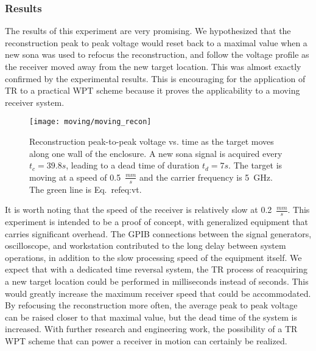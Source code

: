 \subsubsection{Results}
\label{moving-results}

The results of this experiment are very promising. We hypothesized that the reconstruction peak to peak voltage would reset back to a maximal value when a new sona was used to refocus the reconstruction, and follow the voltage profile as the receiver moved away from the new target location. This was almost exactly confirmed by the experimental results. This is encouraging for the application of TR to a practical WPT scheme because it proves the applicability to a moving receiver system.

\begin{figure}[t]
\centering
\texttt{[image: moving/moving\_recon]}
    \caption[Peak-to-peak voltage of moving reconstructions]{Reconstruction peak-to-peak voltage vs. time as the target moves along one wall of the enclosure. A new sona signal is acquired every $t_c = 39.8s$, leading to a dead time of duration $t_d = 7s$. The target is moving at a speed of 0.5~$\frac{mm}{s}$ and the carrier frequency is 5~GHz. The green line is Eq.~ref{eq:vt}.}
    \label{fig:moving-recon}
\end{figure}

It is worth noting that the speed of the receiver is relatively slow at 0.2~$\frac{mm}{s}$. This experiment is intended to be a proof of concept, with generalized equipment that carries significant overhead. The GPIB connections between the signal generators, oscilloscope, and workstation contributed to the long delay between system operations, in addition to the slow processing speed of the equipment itself. We expect that with a dedicated time reversal system, the TR process of reacquiring a new target location could be performed in milliseconds instead of seconds. This would greatly increase the maximum receiver speed that could be accommodated. By refocusing the reconstruction more often, the average peak to peak voltage can be raised closer to that maximal value, but the dead time of the system is increased. With further research and engineering work, the possibility of a TR WPT scheme that can power a receiver in motion can certainly be realized.
